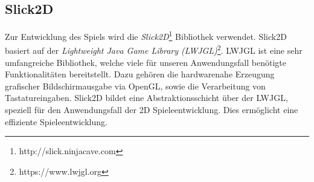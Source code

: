 \subsection{Slick2D}

Zur Entwicklung des Spiels wird die \textit{Slick2D}\footnote{http://slick.ninjacave.com} Bibliothek verwendet.
Slick2D basiert auf der \textit{Lightweight Java Game Library (LWJGL)}\footnote{https://www.lwjgl.org}.
LWJGL ist eine sehr umfangreiche Bibliothek, welche viele für unseren Anwendungsfall benötigte Funktionalitäten bereitstellt.
Dazu gehören die hardwarenahe Erzeugung grafischer Bildschirmausgabe via OpenGL, sowie die Verarbeitung von Tastatureingaben.
Slick2D bildet eine Abstraktionsschicht über der LWJGL, speziell für den Anwendungsfall der 2D Spieleentwicklung.
Dies ermöglicht eine effiziente Spieleentwicklung.